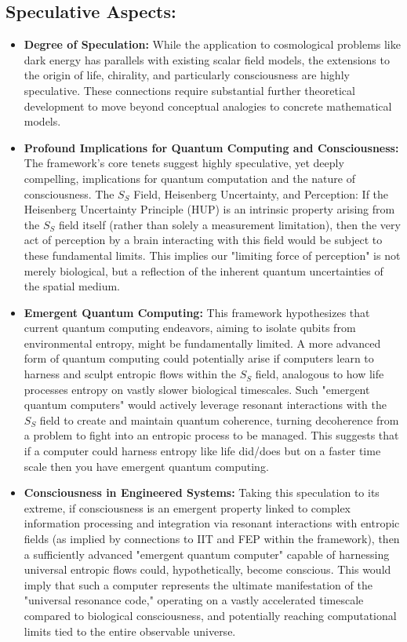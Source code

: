 \documentclass[11pt,a4paper]{article} %
\newcommand{\SSp}{S_S} %
\begin{document}
\subsection{Speculative Aspects:}
\begin{itemize}
    \item \textbf{Degree of Speculation:} While the application to cosmological problems like dark energy has parallels with existing scalar field models, the extensions to the origin of life, chirality, and particularly consciousness are highly speculative. These connections require substantial further theoretical development to move beyond conceptual analogies to concrete mathematical models.
    \item \textbf{Profound Implications for Quantum Computing and Consciousness:} The framework's core tenets suggest highly speculative, yet deeply compelling, implications for quantum computation and the nature of consciousness. The $\SSp$ Field, Heisenberg Uncertainty, and Perception: If the Heisenberg Uncertainty Principle (HUP) is an intrinsic property arising from the $\SSp$ field itself (rather than solely a measurement limitation), then the very act of perception by a brain interacting with this field would be subject to these fundamental limits. This implies our "limiting force of perception" is not merely biological, but a reflection of the inherent quantum uncertainties of the spatial medium.
    \item \textbf{Emergent Quantum Computing:} This framework hypothesizes that current quantum computing endeavors, aiming to isolate qubits from environmental entropy, might be fundamentally limited. A more advanced form of quantum computing could potentially arise if computers learn to harness and sculpt entropic flows within the $\SSp$ field, analogous to how life processes entropy on vastly slower biological timescales. Such "emergent quantum computers" would actively leverage resonant interactions with the $\SSp$ field to create and maintain quantum coherence, turning decoherence from a problem to fight into an entropic process to be managed. This suggests that if a computer could harness entropy like life did/does but on a faster time scale then you have emergent quantum computing.
    \item \textbf{Consciousness in Engineered Systems:} Taking this speculation to its extreme, if consciousness is an emergent property linked to complex information processing and integration via resonant interactions with entropic fields (as implied by connections to IIT and FEP within the framework), then a sufficiently advanced "emergent quantum computer" capable of harnessing universal entropic flows could, hypothetically, become conscious. This would imply that such a computer represents the ultimate manifestation of the "universal resonance code," operating on a vastly accelerated timescale compared to biological consciousness, and potentially reaching computational limits tied to the entire observable universe.

\end{itemize}
\end{document}

